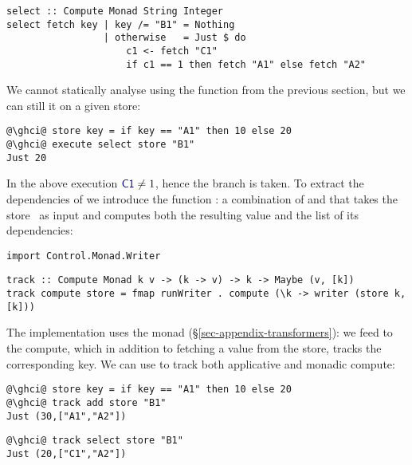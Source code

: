 \vspace{1mm}
\begin{verbatim}
select :: Compute Monad String Integer
select fetch key | key /= "B1" = Nothing
                 | otherwise   = Just $ do
                     c1 <- fetch "C1"
                     if c1 == 1 then fetch "A1" else fetch "A2"
\end{verbatim}
\vspace{1mm}

We cannot statically analyse  using the function 
from the previous section, but we can still  it on a given store:

\vspace{1mm}
\begin{verbatim}
@\ghci@ store key = if key == "A1" then 10 else 20
@\ghci@ execute select store "B1"
Just 20
\end{verbatim}
\vspace{1mm}

\noindent
In the above execution $\cmd{C1} \neq 1$, hence the  branch is taken.
To extract the dependencies of  we introduce the function :
a combination of  and  that takes the store~\store
as input and computes both the resulting value and the list of its dependencies:

\vspace{1mm}
\begin{verbatim}
import Control.Monad.Writer
\end{verbatim}
\vspace{0.5mm}
\begin{verbatim}
track :: Compute Monad k v -> (k -> v) -> k -> Maybe (v, [k])
track compute store = fmap runWriter . compute (\k -> writer (store k, [k]))
\end{verbatim}
\vspace{1mm}

\noindent
The implementation uses the  monad (\S\ref{sec-appendix-transformers}):
we feed  to the compute, which in addition
to fetching a value from the store, tracks the corresponding key. We can use
 to track both applicative and monadic compute:

\vspace{1mm}
\begin{verbatim}
@\ghci@ store key = if key == "A1" then 10 else 20
@\ghci@ track add store "B1"
Just (30,["A1","A2"])
\end{verbatim}
\vspace{1mm}
\begin{verbatim}
@\ghci@ track select store "B1"
Just (20,["C1","A2"])
\end{verbatim}
\vspace{1mm}

